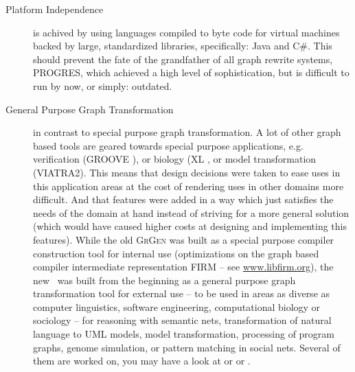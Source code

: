 \begin{description}
\item[Platform Independence]
is achived by using languages compiled to byte code for virtual machines backed by large, standardized libraries, specifically: Java and C\#.
This should prevent the fate of the grandfather of all graph rewrite systems, PROGRES\cite{schuerr99progres},
which achieved a high level of sophistication, but is difficult to run by now, or simply: outdated.

\item[General Purpose Graph Transformation]
in contrast to special purpose graph transformation.
A lot of other graph based tools are geared towards special purpose applications,
e.g. verification (GROOVE \cite{Groove}), or biology (XL \cite{xl}, or model transformation (VIATRA2\cite{viatra2}).
This means that design decisions were taken to ease uses in this application areas at the cost of rendering uses in other domains more difficult.
And that features were added in a way which just satisfies the needs of the domain at hand instead of striving for a more general solution
(which would have caused higher costs at designing and implementing this features).
While the old \textsc{GrGen} was built as a special purpose compiler construction tool for internal use
(optimizations on the graph based compiler intermediate representation FIRM -- see \url{www.libfirm.org}),
the new \GrG\ was built from the beginning as a general purpose graph transformation tool for external use
-- to be used in areas as diverse as computer linguistics, software engineering, computational biology or sociology --
for reasoning with semantic nets, transformation of natural language to UML models,
model transformation, processing of program graphs, genome simulation, or pattern matching in social nets.
Several of them are worked on, you may have a look at \cite{usecomputerlinguistics} or \cite{usemodeltransformation} or \cite{usegeneexpression}.

\end{description}
